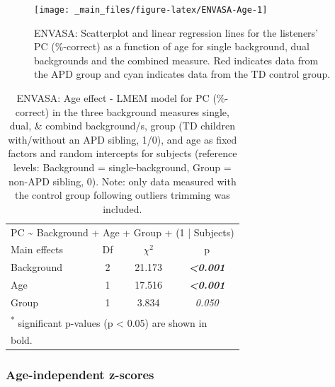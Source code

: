 \documentclass[a4paper, twoside]{templates/ociamthesis}
\begin{document}
\begin{figure}

{\centering \texttt{[image: \_main\_files/figure-latex/ENVASA-Age-1]} 

}

\caption{ENVASA: Scatterplot and linear regression lines for the listeners' PC (\%-correct) as a function of age for single background, dual backgrounds and the combined measure. Red indicates data from the APD group and cyan indicates data from the TD control group.}\label{fig:ENVASA-Age}
\end{figure}

\begin{table}

\caption{\label{tab:ENVASA-AgeLMEMTab}ENVASA: Age effect - LMEM model for PC (\%-correct) in the three background measures single, dual, \& combind background/s, group (TD children with/without an APD sibling, 1/0), and age as fixed factors and random intercepts for subjects (reference levels: Background = single-background, Group = non-APD sibling, 0). Note: only data measured with the control group following outliers trimming was included.}
\centering
\begin{tabular}[t]{lcc>{}c}
\toprule
\multicolumn{4}{c}{PC \textasciitilde{} Background + Age + Group + (1 | Subjects)} \\
\cmidrule(l{3pt}r{3pt}){1-4}
Main effects & Df & $\chi^{2}$ & p\\
\midrule
Background & 2 & 21.173 & \em{\textbf{<0.001}}\\
Age & 1 & 17.516 & \em{\textbf{<0.001}}\\
Group & 1 & 3.834 & \em{0.050}\\
\bottomrule
\multicolumn{4}{l}{\textsuperscript{*} significant p-values (p < 0.05) are shown in}\\
\multicolumn{4}{l}{bold.}\\
\end{tabular}
\end{table}

\hypertarget{age-independent-z-scores-2}{%
\subsubsection*{Age-independent z-scores}\label{age-independent-z-scores-2}}
\end{document}
